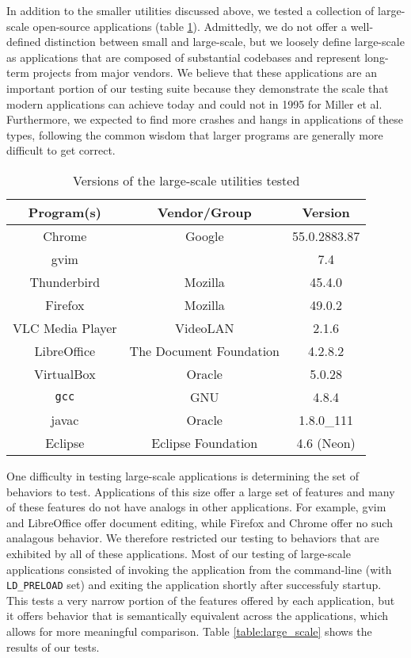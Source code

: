 In addition to the smaller utilities discussed above, we tested a collection of large-scale open-source applications (table \ref{tab:large_scale_versions}). Admittedly, we do not offer a well-defined distinction between small and large-scale, but we loosely define large-scale as applications that are composed of substantial codebases and represent long-term projects from major vendors. We believe that these applications are an important portion of our testing suite because they demonstrate the scale that modern applications can achieve today and could not in 1995 for Miller et al. Furthermore, we expected to find more crashes and hangs in applications of these types, following the common wisdom that larger programs are generally more difficult to get correct.

\begin{table}[h!]
\begin{center}
\begin{tabular}{ |c|c|c| }
\hline
\multicolumn{1}{|c|}{\textbf{Program(s)}} & \multicolumn{1}{c|}{\textbf{Vendor/Group}} & \multicolumn{1}{c|}{\textbf{Version}} \\
\hline
Chrome & Google & 55.0.2883.87 \\
gvim & & 7.4 \\
Thunderbird & Mozilla & 45.4.0\\
Firefox & Mozilla & 49.0.2 \\
VLC Media Player &VideoLAN & 2.1.6\\
LibreOffice & The Document Foundation & 4.2.8.2\\
VirtualBox & Oracle & 5.0.28\\
\texttt{gcc} & GNU & 4.8.4\\
javac & Oracle & 1.8.0\_111\\
Eclipse & Eclipse Foundation & 4.6 (Neon) \\
\hline
\end{tabular}
\caption{Versions of the large-scale utilities tested}
\label{tab:large_scale_versions}
\end{center}
\end{table}


One difficulty in testing large-scale applications is determining the set of behaviors to test. Applications of this size offer a large set of features and many of these features do not have analogs in other applications. For example, gvim and LibreOffice offer document editing, while Firefox and Chrome offer no such analagous behavior. We therefore restricted our testing to behaviors that are exhibited by all of these applications. Most of our testing of large-scale applications consisted of invoking the application from the command-line (with \texttt{LD\_PRELOAD} set) and exiting the application shortly after successfuly startup. This tests a very narrow portion of the features offered by each application, but it offers behavior that is semantically equivalent across the applications, which allows for more meaningful comparison. Table \ref{table:large_scale} shows the results of our tests.

